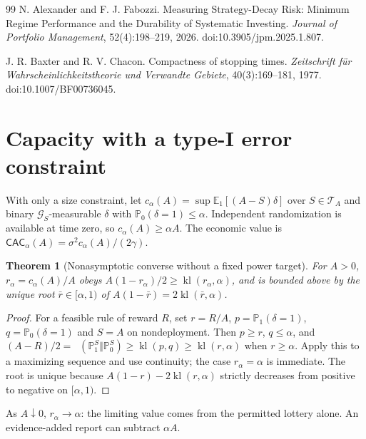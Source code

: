 \documentclass[11pt]{article}
\numberwithin{equation}{section}
\theoremstyle{plain}
\newtheorem{theorem}{Theorem}[section]
\theoremstyle{definition}
\theoremstyle{remark}
\DeclareMathOperator{\KL}{D_{\mathrm{KL}}}
\newcommand{\Pzero}{\mathbb P_0}
\newcommand{\Pone}{\mathbb P_1}
\newcommand{\Eone}{\mathbb E_1}
\begin{document}
\begin{thebibliography}{99}
N. Alexander and F. J. Fabozzi.
\newblock Measuring Strategy-Decay Risk: Minimum Regime Performance and the Durability of Systematic Investing.
\newblock \emph{Journal of Portfolio Management}, 52(4):198--219, 2026.
\newblock doi:10.3905/jpm.2025.1.807.

J. R. Baxter and R. V. Chacon.
\newblock Compactness of stopping times.
\newblock \emph{Zeitschrift f\"ur Wahrscheinlichkeitstheorie und Verwandte Gebiete}, 40(3):169--181, 1977.
\newblock doi:10.1007/BF00736045.

\end{thebibliography}\fussy

\appendix

\section{Capacity with a type-I error constraint}\label{capacity-under-a-type-i-constraint}

With only a size constraint, let $c_\alpha(A)=\sup\Eone[(A-S)\delta]$ over $S\in\mathcal T_A$ and binary $\mathcal G_S$-measurable $\delta$ with $\Pzero(\delta=1)\le\alpha$. Independent randomization is available at time zero, so $c_\alpha(A)\ge\alpha A$. The economic value is $\mathsf{CAC}_\alpha(A)=\sigma^2c_\alpha(A)/(2\gamma)$.
\begin{theorem}[Nonasymptotic converse without a fixed power target]
For $A>0$, $r_\alpha=c_\alpha(A)/A$ obeys $A(1-r_\alpha)/2\ge\operatorname{kl}(r_\alpha,\alpha)$, and is bounded above by the unique root $\bar r\in[\alpha,1)$ of $A(1-\bar r)=2\operatorname{kl}(\bar r,\alpha)$.
\end{theorem}
\begin{proof}
For a feasible rule of reward $R$, set $r=R/A$, $p=\Pone(\delta=1)$, $q=\Pzero(\delta=1)$ and $S=A$ on nondeployment. Then $p\ge r$, $q\le\alpha$, and $(A-R)/2=\KL(\Pone^S\Vert\Pzero^S)\ge\operatorname{kl}(p,q)\ge\operatorname{kl}(r,\alpha)$ when $r\ge\alpha$. Apply this to a maximizing sequence and use continuity; the case $r_\alpha=\alpha$ is immediate. The root is unique because $A(1-r)-2\operatorname{kl}(r,\alpha)$ strictly decreases from positive to negative on $[\alpha,1)$.
\end{proof}
As $A\downarrow0$, $r_\alpha\to\alpha$: the limiting value comes from the permitted lottery alone. An evidence-added report can subtract $\alpha A$.
\end{document}
